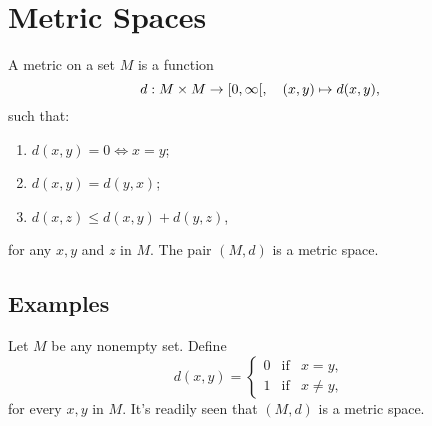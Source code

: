 \section{Metric Spaces}\label{sec:metric-spaces}

\begin{definition}\label{def:metric-space}
  A metric on a set $ M $ is a function
  \[
    d:M\times{M}\to\rinterval{0}{\infty},\quad(x,y)\mapsto{d(x,y)},
  \]
  such that:
  \begin{enumerate}
    \item
      $ d(x,y)=0\iff{x=y} $;
    \item
      $ d(x,y)=d(y,x) $;
    \item
      $ d(x,z) \leqslant d(x,y) + d(y,z) $,
  \end{enumerate}
  for any $ x,y $ and $ z $ in $ M $. The pair $ (M,d) $ is a metric space.
\end{definition}

\subsection{Examples}\label{ssec:examples}

\begin{example}\label{ex:zero-one}
  Let $ M $ be any nonempty set. Define
  \[
    d(x,y)
    =
    \left\{\begin{array}{ccc}
      0 & \text{if} & x=y, \\
      1 & \text{if} & x\neq{y},
    \end{array}\right.
  \]
  for every $ x,y $ in $ M $. It's readily seen that $ (M,d) $ is a metric space.
\end{example}
